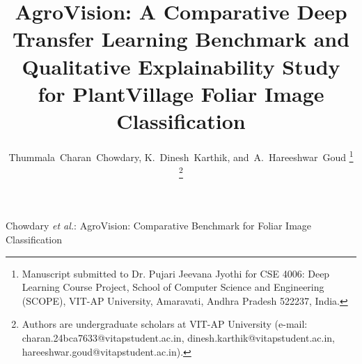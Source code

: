 \documentclass[journal]{IEEEtran}
\begin{document}
\title{AgroVision: A Comparative Deep Transfer Learning Benchmark and Qualitative Explainability Study for PlantVillage Foliar Image Classification}

\author{Thummala~Charan~Chowdary,
        K.~Dinesh~Karthik,
        and~A.~Hareeshwar~Goud%
\thanks{Manuscript submitted to Dr. Pujari Jeevana Jyothi for CSE 4006: Deep Learning Course Project, School of Computer Science and Engineering (SCOPE), VIT-AP University, Amaravati, Andhra Pradesh 522237, India.}%
\thanks{Authors are undergraduate scholars at VIT-AP University (e-mail: charan.24bca7633@vitapstudent.ac.in, dinesh.karthik@vitapstudent.ac.in, hareeshwar.goud@vitapstudent.ac.in).}}

%
{Chowdary \MakeLowercase{\textit{et al.}}: AgroVision: Comparative Benchmark for Foliar Image Classification}

\maketitle
\end{document}
